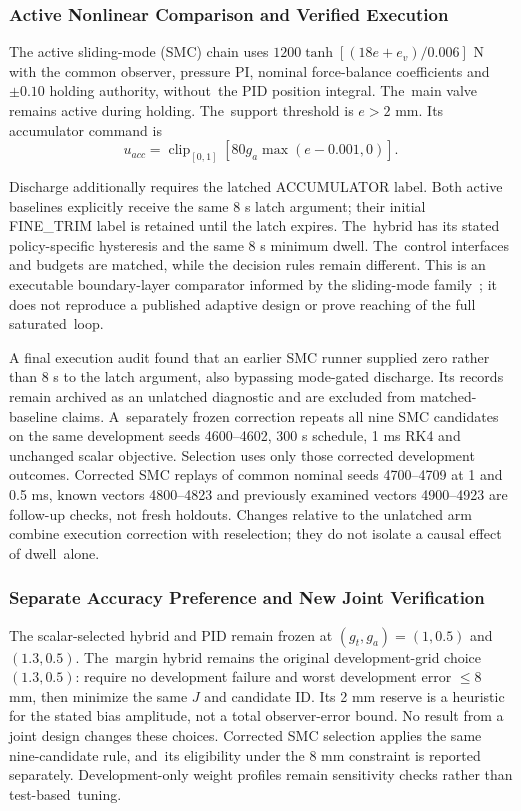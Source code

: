 \documentclass[machines,article,submit,pdftex,moreauthors]{Definitions/mdpi}
\begin{document}
\subsubsection{Active Nonlinear Comparison and Verified Execution}
The active sliding-mode (SMC) chain uses $1200\tanh[(18e+e_v)/0.006]$ N with the common observer, pressure PI, nominal force-balance coefficients and $\pm0.10$ holding authority, without~the PID position integral. The~main valve remains active during holding. The~support threshold is $e>2$ mm. Its accumulator command is
\[
u_{acc}=\operatorname{clip}_{[0,1]}[80g_a\max(e-0.001,0)].
\]

Discharge additionally requires the latched ACCUMULATOR label. Both active baselines explicitly receive the same 8 s latch argument; their initial FINE\_TRIM label is retained until the latch expires. The~hybrid has its stated policy-specific hysteresis and the same 8 s minimum dwell. The~control interfaces and budgets are matched, while the decision rules remain different. This is an executable boundary-layer comparator informed by the sliding-mode family~\cite{tang2011,guan2008}; it does not reproduce a published adaptive design or prove reaching of the full saturated~loop.

A final execution audit found that an earlier SMC runner supplied zero rather than 8 s to the latch argument, also bypassing mode-gated discharge. Its records remain archived as an unlatched diagnostic and are excluded from matched-baseline claims. A~separately frozen correction repeats all nine SMC candidates on the same development seeds \mbox{4600--4602}, 300 s schedule, 1 ms RK4 and unchanged scalar objective. Selection uses only those corrected development outcomes. Corrected SMC replays of common nominal seeds 4700--4709 at 1 and 0.5 ms, known vectors 4800--4823 and previously examined vectors 4900--4923 are follow-up checks, not fresh holdouts. Changes relative to the unlatched arm combine execution correction with reselection; they do not isolate a causal effect of dwell~alone.

\subsubsection{Separate Accuracy Preference and New Joint Verification}
The scalar-selected hybrid and PID remain frozen at $(g_t,g_a)=(1,0.5)$ and $(1.3,0.5)$. The~margin hybrid remains the original development-grid choice $(1.3,0.5)$: require no development failure and worst development error $\le8$ mm, then minimize the same $J$ and candidate ID. Its 2 mm reserve is a heuristic for the stated bias amplitude, not a total observer-error bound. No result from a joint design changes these choices. Corrected SMC selection applies the same nine-candidate rule, and~its eligibility under the 8 mm constraint is reported separately. Development-only weight profiles remain sensitivity checks rather than test-based~tuning.
\end{document}
